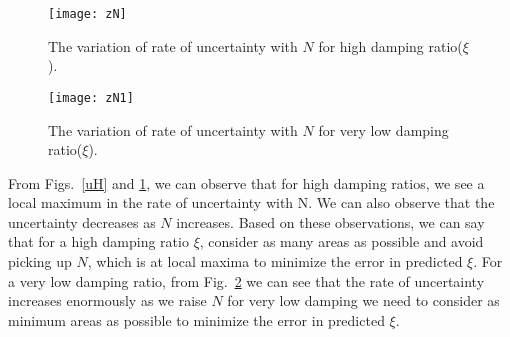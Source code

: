 \begin{figure}[h]
\texttt{[image: zN]}
\centering
\caption{The variation of rate of uncertainty with $N$ for high damping ratio($\xi$).}
\label{uH1}
\end{figure}
\begin{figure}[h]
\texttt{[image: zN1]}
\centering
\caption{The variation of rate of uncertainty with $N$ for very low damping ratio($\xi$).}
\label{uL1}
\end{figure}

From Figs.~\ref{uH} and \ref{uH1}, we can observe that for high damping ratios, we see a local maximum in the rate of uncertainty with N. We can also observe that the uncertainty decreases as $N$ increases. Based on these observations, we can say that for a high damping ratio $\xi$, consider as many areas as possible and avoid picking up $N$, which is at local maxima to minimize the error in predicted $\xi$.
For a very low damping ratio, from Fig.~\ref{uL1} we can see that the rate of uncertainty increases enormously as we raise $N$ for very low damping we need to consider as minimum areas as possible to minimize the error in predicted $\xi$.

